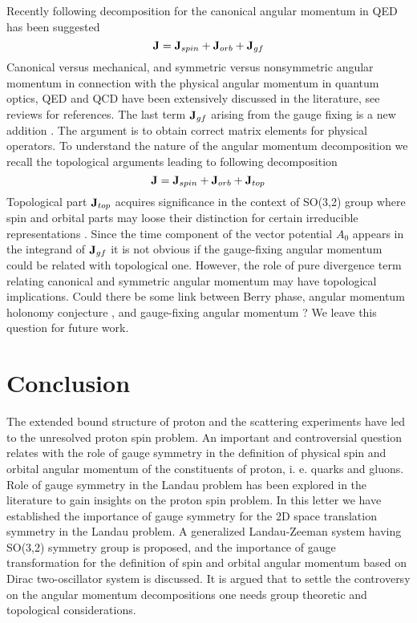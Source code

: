 \documentclass[aps, singlecolumn, showpacs]{revtex4-2}
\begin{document}
Recently following decomposition for the canonical angular momentum in QED has been suggested \cite{12}
\begin{equation}
{\bf J} = {\bf J}_{spin} + {\bf J}_{orb} + {\bf J}_{gf}
\end{equation}
Canonical versus mechanical, and symmetric versus nonsymmetric angular momentum in connection with the physical angular momentum in quantum optics, QED and QCD have been extensively discussed in the literature, see reviews \cite{4,5} for references. The last term ${\bf J}_{gf}$ arising from the gauge fixing is a new addition \cite{12}. The argument is to obtain correct matrix elements for physical operators. To understand the nature of the angular momentum decomposition we recall the topological arguments \cite{10} leading to following decomposition
\begin{equation}
{\bf J} = {\bf J}_{spin} + {\bf J}_{orb} + {\bf J}_{top}
\end{equation}
Topological part ${\bf J}_{top}$ acquires significance in the context of SO(3,2) group where spin and orbital parts may loose their distinction for certain irreducible representations \cite{29,30,31}. Since the time component of the vector potential $A_0$ appears in the integrand of 
$ {\bf J}_{gf}$ it is not obvious if the gauge-fixing angular momentum could be related with topological one. However, the role of pure divergence term relating canonical and symmetric angular momentum may have topological implications. Could there be some link between Berry phase, angular momentum holonomy conjecture \cite{36}, and gauge-fixing angular momentum \cite{12}? We leave this question for future work.

\section{\bf Conclusion}

The extended bound structure of proton and the scattering experiments have led to the unresolved proton spin problem. An important and controversial question relates with the role of gauge symmetry in the definition of physical spin and orbital angular momentum of the constituents of proton, i. e. quarks and gluons. Role of gauge symmetry in the Landau problem has been explored in the literature to gain insights on the proton spin problem. In this letter we have established the importance of gauge symmetry for the 2D space translation symmetry in the Landau problem. A generalized Landau-Zeeman system having SO(3,2) symmetry group is proposed, and the importance of gauge transformation for the definition of spin and orbital angular momentum based on Dirac two-oscillator system is discussed. It is argued that to settle the controversy on the angular momentum decompositions one needs group theoretic and topological considerations.
\end{document}
